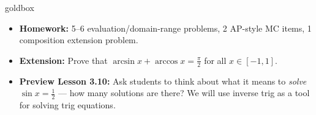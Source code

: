 \documentclass[10pt]{article}
\begin{document}
\begin{skillbox}{goldbox}
\begin{itemize}[leftmargin=1.4em, itemsep=2pt]
    \item \textbf{Homework:} 5--6 evaluation/domain-range problems,
          2 AP-style MC items, 1 composition extension problem.
    \item \textbf{Extension:} Prove that
          $\arcsin x + \arccos x = \tfrac{\pi}{2}$ for all $x \in [-1,1]$.
    \item \textbf{Preview Lesson 3.10:} Ask students to think about what it
          means to \emph{solve} $\sin x = \tfrac{1}{2}$ --- how many solutions
          are there?  We will use inverse trig as a tool for solving trig
          equations.
\end{itemize}
\end{skillbox}
\end{document}

